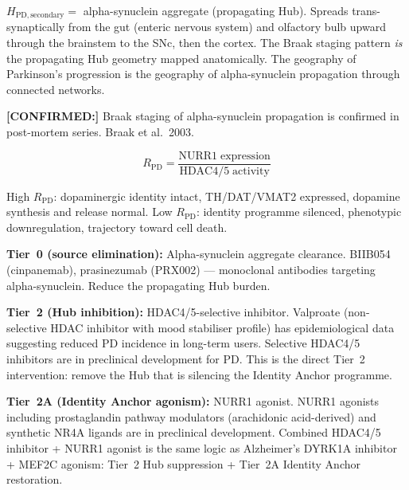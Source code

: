 \documentclass[12pt,a4paper]{article}
\newcommand{\rpd}{$R_{\mathrm{PD}}$}
\newcommand{\confirmed}[1]{\noindent\colorbox{green!10}{\parbox{\dimexpr\linewidth-2\fboxsep}{%
  \textbf{[CONFIRMED:]} #1}}\vspace{0.4em}}
\begin{document}
\begin{description}[leftmargin=2em, itemsep=0.5em]
    $H_{\mathrm{PD,secondary}} = $ alpha-synuclein aggregate (propagating
    Hub). Spreads trans-synaptically from the gut (enteric nervous system)
    and olfactory bulb upward through the brainstem to the SNc, then the
    cortex. The Braak staging pattern \textit{is} the propagating Hub
    geometry mapped anatomically. The geography of Parkinson's progression
    is the geography of alpha-synuclein propagation through connected
    networks.

    \confirmed{Braak staging of alpha-synuclein propagation is confirmed
    in post-mortem series. Braak et al.\ 2003.}

  \item[\textbf{Step~5 --- Identity Axis:}]
    \begin{equation}
      R_{\mathrm{PD}} = \frac{\mathrm{NURR1 \; expression}}
                             {\mathrm{HDAC4/5 \; activity}}
    \end{equation}

    High \rpd{}: dopaminergic identity intact, TH/DAT/VMAT2 expressed,
    dopamine synthesis and release normal. Low \rpd{}: identity programme
    silenced, phenotypic downregulation, trajectory toward cell death.

  \item[\textbf{Step~6 --- Drug protocol:}]

    \textbf{Tier~0 (source elimination):}
    Alpha-synuclein aggregate clearance. BIIB054 (cinpanemab),
    prasinezumab (PRX002) --- monoclonal antibodies targeting
    alpha-synuclein. Reduce the propagating Hub burden.

    \textbf{Tier~2 (Hub inhibition):}
    HDAC4/5-selective inhibitor. Valproate (non-selective HDAC inhibitor
    with mood stabiliser profile) has epidemiological data suggesting
    reduced PD incidence in long-term users. Selective HDAC4/5 inhibitors
    are in preclinical development for PD. This is the direct Tier~2
    intervention: remove the Hub that is silencing the Identity Anchor
    programme.

    \textbf{Tier~2A (Identity Anchor agonism):}
    NURR1 agonist. NURR1 agonists including prostaglandin pathway
    modulators (arachidonic acid-derived) and synthetic NR4A ligands are
    in preclinical development. Combined HDAC4/5 inhibitor + NURR1 agonist
    is the same logic as Alzheimer's DYRK1A inhibitor + MEF2C agonism:
    Tier~2 Hub suppression + Tier~2A Identity Anchor restoration.


\end{description}
\end{document}
